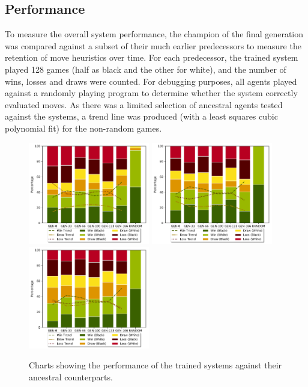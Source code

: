 \documentclass[12pt,a4paper]{article}
\begin{document}
    \subsection{Performance}
    To measure the overall system performance, the champion of the final generation was compared against a subset of their much earlier predecessors to measure the retention of move heuristics over time. For each predecessor, the trained system played 128 games (half as black and the other for white), and the number of wins, losses and draws were counted. For debugging purposes, all agents played against a randomly playing program to determine whether the system correctly evaluated moves. As there was a limited selection of ancestral agents tested against the systems, a trend line was produced (with a least squares cubic polynomial fit) for the non-random games.
    \begin{figure}[!ht]
        \centering
        \includegraphics[width=53mm]{images/results/1ply/gm_net_stats.pdf}
        \includegraphics[width=53mm]{images/results/3ply/gm_net_stats.pdf}
        \includegraphics[width=53mm]{images/results/6ply/gm_net_stats.pdf}
        \caption{Charts showing the performance of the trained systems against their ancestral counterparts.\label{net_stats}}
    \end{figure}
    
\end{document}

